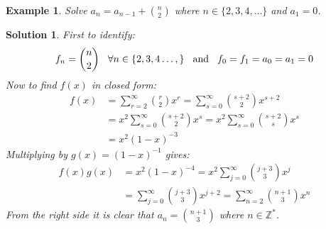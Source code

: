 \documentclass[12pt, letterpaper, onecolumn, conference, final]{IEEEtran}
\theoremstyle{definition}
\theoremstyle{plain}
\newtheorem{example}{Example}[section]
\newtheorem{solution}{Solution}[section]
\begin{document}
\begin{example}
Solve $a_n=a_{n-1}+{n \choose 2}$ where $n \in \{2,3,4,\dots\}$ and $a_1=0$.
\end{example}
\begin{solution}
First to identify:
\begin{equation*}
f_n = {n \choose 2} \hspace{.3cm} \forall n \in \{2,3,4\dots,\} \hspace{.3cm} \text{and} \hspace{.3cm} f_0 = f_1 = a_0 = a_1 = 0
\end{equation*}
Now to find $f(x)$ in closed form:
\begin{equation*}
\begin{split}
f(x) &= \sum_{r=2}^\infty {r \choose 2}x^r = \sum_{s=0}^\infty {s+2 \choose 2} x^{s+2} \\
&= x^2 \sum_{s=0}^\infty {s+2 \choose 2} x^s = x^2 \sum_{s=0}^\infty {s+2 \choose s} x^s \\
&= x^2 (1-x)^{-3}
\end{split}
\end{equation*}
Multiplying by $g(x) = (1-x)^{-1}$ gives:
\begin{equation*}
\begin{split}
f(x)g(x) &= x^2 (1-x)^{-4} = x^2 \sum_{j=0}^\infty {j+3 \choose 3} x^j \\
&= \sum_{j=0}^\infty {j+3 \choose 3} x^{j+2} = \sum_{n=2}^\infty {n+1 \choose 3} x^n
\end{split}
\end{equation*}
From the right side it is clear that $a_n = {n+1 \choose 3}$ where $n \in \mathbb{Z}^*$.
\end{solution}
\end{document}
